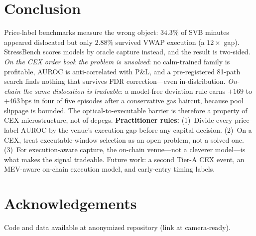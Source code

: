 \documentclass[sigconf,anonymous,natbib=false]{acmart}
\newcommand{\bps}{\,\text{bps}}
\begin{document}
\section{Conclusion}
\label{sec:conclusion}

Price-label benchmarks measure the wrong object: $34.3\%$ of SVB minutes appeared
dislocated but only $2.88\%$ survived VWAP execution (a $12\times$ gap). StressBench scores
models by oracle capture instead, and the result is two-sided. \emph{On the CEX order book the
problem is unsolved}: no calm-trained family is profitable, AUROC is anti-correlated with P\&L,
and a pre-registered 81-path search finds nothing that survives FDR correction---even
in-distribution. \emph{On-chain the same dislocation is tradeable}: a model-free deviation rule
earns $+169$ to $+463\bps$ in four of five episodes after a conservative gas haircut, because
pool slippage is bounded. The optical-to-executable barrier is therefore a property of CEX
microstructure, not of depegs.
\textbf{Practitioner rules:}
(1)~Divide every price-label AUROC by the venue's execution gap before any capital decision.
(2)~On a CEX, treat executable-window selection as an open problem, not a solved one.
(3)~For execution-aware capture, the on-chain venue---not a cleverer model---is what makes the
signal tradeable.
Future work: a second Tier-A CEX event, an MEV-aware on-chain execution model, and early-entry
timing labels.

\section*{Acknowledgements}
Code and data available at anonymized repository (link at camera-ready).
\end{document}
